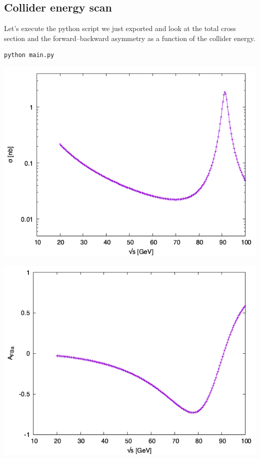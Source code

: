 \documentclass[11pt]{article}
\begin{document}
\subsection{Collider energy scan}
\label{sec:org5792c60}
Let's execute the python script we just exported and look at the total cross section and the forward--backward asymmetry as a function of the collider energy.
\begin{verbatim}
python main.py
\end{verbatim}

\begin{center}
\includegraphics[width=.9\linewidth]{sigma.png}
\end{center}


\begin{center}
\includegraphics[width=.9\linewidth]{AFB.png}
\end{center}
\end{document}
